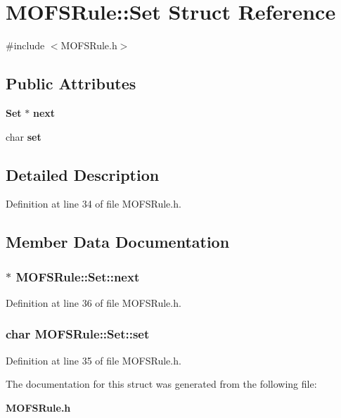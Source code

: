 \section{M\-O\-F\-S\-Rule\-:\-:Set Struct Reference}
\label{structMOFSRule_1_1Set}


{\ttfamily \#include $<$M\-O\-F\-S\-Rule.\-h$>$}

\subsection*{Public Attributes}
\begin{DoxyCompactItemize}
\item 
{\bf Set} $\ast$ {\bf next}
\item 
char {\bf set}
\end{DoxyCompactItemize}


\subsection{Detailed Description}


Definition at line 34 of file M\-O\-F\-S\-Rule.\-h.



\subsection{Member Data Documentation}
\subsubsection[{next}]{$\ast$ M\-O\-F\-S\-Rule\-::\-Set\-::next}\label{structMOFSRule_1_1Set_a693b1922d6b82d56e61778d80419106c}


Definition at line 36 of file M\-O\-F\-S\-Rule.\-h.

\subsubsection[{set}]{\setlength{\rightskip}{0pt plus 5cm}char M\-O\-F\-S\-Rule\-::\-Set\-::set}\label{structMOFSRule_1_1Set_a4acfeabdf9c4559932a3e1da547d6630}


Definition at line 35 of file M\-O\-F\-S\-Rule.\-h.



The documentation for this struct was generated from the following file\-:\begin{DoxyCompactItemize}
\item 
{\bf M\-O\-F\-S\-Rule.\-h}\end{DoxyCompactItemize}
